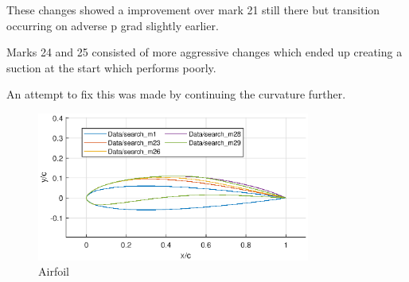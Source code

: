 \documentclass{article}
\begin{document}
These changes showed a improvement over mark 21 still there but transition occurring on adverse p grad slightly earlier. 

Marks 24 and 25 consisted of more aggressive changes which ended up creating a suction at the start which performs poorly.

An attempt to fix this was made by continuing the curvature further. 

\begin{figure}[H]
    \centering
    \includegraphics[width=0.8\textwidth]{figures/loRe_geometry_29.eps}
    \caption{Airfoil}
    \label{fig:m29_geometry}
\end{figure}
\end{document}
